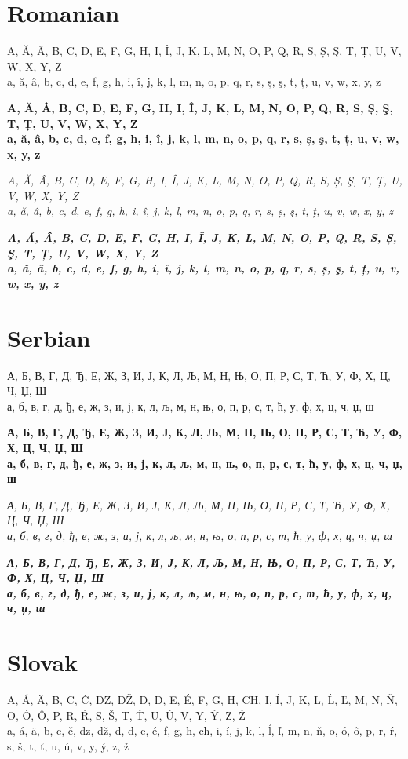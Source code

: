 \documentclass[12pt]{article}
\begin{document}
\section{Romanian}
A, Ă, Â, B, C, D, E, F, G, H, I, Î, J, K, L, M, N, O, P, Q, R, S, Ș, Ş, T, Ț, U, V, W, X, Y, Z \\
a, ă, â, b, c, d, e, f, g, h, i, î, j, k, l, m, n, o, p, q, r, s, ș, ş, t, ț, u, v, w, x, y, z

\textbf{
A, Ă, Â, B, C, D, E, F, G, H, I, Î, J, K, L, M, N, O, P, Q, R, S, Ș, Ş, T, Ț, U, V, W, X, Y, Z \\
a, ă, â, b, c, d, e, f, g, h, i, î, j, k, l, m, n, o, p, q, r, s, ș, ş, t, ț, u, v, w, x, y, z
}

\textit{
A, Ă, Â, B, C, D, E, F, G, H, I, Î, J, K, L, M, N, O, P, Q, R, S, Ș, Ş, T, Ț, U, V, W, X, Y, Z \\
a, ă, â, b, c, d, e, f, g, h, i, î, j, k, l, m, n, o, p, q, r, s, ș, ş, t, ț, u, v, w, x, y, z
}

\textbf{\textit{
A, Ă, Â, B, C, D, E, F, G, H, I, Î, J, K, L, M, N, O, P, Q, R, S, Ș, Ş, T, Ț, U, V, W, X, Y, Z \\
a, ă, â, b, c, d, e, f, g, h, i, î, j, k, l, m, n, o, p, q, r, s, ș, ş, t, ț, u, v, w, x, y, z
}}


\clearpage
\section{Serbian}
А, Б, В, Г, Д, Ђ, Е, Ж, З, И, Ј, К, Л, Љ, М, Н, Њ, О, П, Р, С, Т, Ћ, У, Ф, Х, Ц, Ч, Џ, Ш \\
а, б, в, г, д, ђ, е, ж, з, и, ј, к, л, љ, м, н, њ, о, п, р, с, т, ћ, у, ф, х, ц, ч, џ, ш

\textbf{
А, Б, В, Г, Д, Ђ, Е, Ж, З, И, Ј, К, Л, Љ, М, Н, Њ, О, П, Р, С, Т, Ћ, У, Ф, Х, Ц, Ч, Џ, Ш \\
а, б, в, г, д, ђ, е, ж, з, и, ј, к, л, љ, м, н, њ, о, п, р, с, т, ћ, у, ф, х, ц, ч, џ, ш
}

\textit{
А, Б, В, Г, Д, Ђ, Е, Ж, З, И, Ј, К, Л, Љ, М, Н, Њ, О, П, Р, С, Т, Ћ, У, Ф, Х, Ц, Ч, Џ, Ш \\
а, б, в, г, д, ђ, е, ж, з, и, ј, к, л, љ, м, н, њ, о, п, р, с, т, ћ, у, ф, х, ц, ч, џ, ш
}

\textbf{\textit{
А, Б, В, Г, Д, Ђ, Е, Ж, З, И, Ј, К, Л, Љ, М, Н, Њ, О, П, Р, С, Т, Ћ, У, Ф, Х, Ц, Ч, Џ, Ш \\
а, б, в, г, д, ђ, е, ж, з, и, ј, к, л, љ, м, н, њ, о, п, р, с, т, ћ, у, ф, х, ц, ч, џ, ш
}}


\section{Slovak}
A, Á, Ä, B, C, Č, DZ, DŽ, D, D, E, É, F, G, H, CH, I, Í, J, K, L, Ĺ, Ľ, M, N, Ň, O, Ó, Ô, P, R, Ŕ, S, Š, T, Ť, U, Ú, V, Y, Ý, Z, Ž \\
a, á, ä, b, c, č, dz, dž, d, d, e, é, f, g, h, ch, i, í, j, k, l, ĺ, ľ, m, n, ň, o, ó, ô, p, r, ŕ, s, š, t, ť, u, ú, v, y, ý, z, ž
\end{document}
